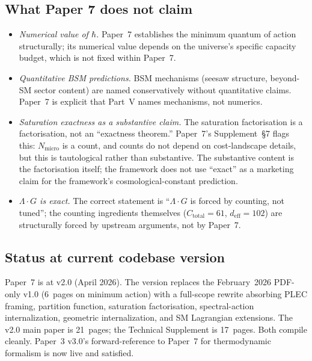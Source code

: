 \documentclass[11pt]{article}
\begin{document}
\subsection{What Paper 7 does not claim}\label{sec:P7_does_not_claim}

\begin{itemize}
    \item \emph{Numerical value of $\hbar$.} Paper~7 establishes the minimum quantum of action structurally; its numerical value depends on the universe's specific capacity budget, which is not fixed within Paper~7.
    \item \emph{Quantitative BSM predictions.} BSM mechanisms (seesaw structure, beyond-SM sector content) are named conservatively without quantitative claims. Paper~7 is explicit that Part~V names mechanisms, not numerics.
    \item \emph{Saturation exactness as a substantive claim.} The saturation factorisation is a factorisation, not an ``exactness theorem.'' Paper~7's Supplement~\S7 flags this: $N_{\mathrm{micro}}$ is a count, and counts do not depend on cost-landscape details, but this is tautological rather than substantive. The substantive content is the factorisation itself; the framework does not use ``exact'' as a marketing claim for the framework's cosmological-constant prediction.
    \item \emph{$\Lambda \cdot G$ is exact.} The correct statement is ``$\Lambda \cdot G$ is forced by counting, not tuned''; the counting ingredients themselves ($C_{\mathrm{total}} = 61$, $d_{\mathrm{eff}} = 102$) are structurally forced by upstream arguments, not by Paper~7.
\end{itemize}

\subsection{Status at current codebase version}\label{sec:P7_status}

Paper~7 is at v2.0 (April 2026). The version replaces the February~2026 PDF-only v1.0 (6~pages on minimum action) with a full-scope rewrite absorbing PLEC framing, partition function, saturation factorisation, spectral-action internalization, geometric internalization, and SM Lagrangian extensions. The v2.0 main paper is 21~pages; the Technical Supplement is 17~pages. Both compile cleanly. Paper~3 v3.0's forward-reference to Paper~7 for thermodynamic formalism is now live and satisfied.

\clearpage
\end{document}
